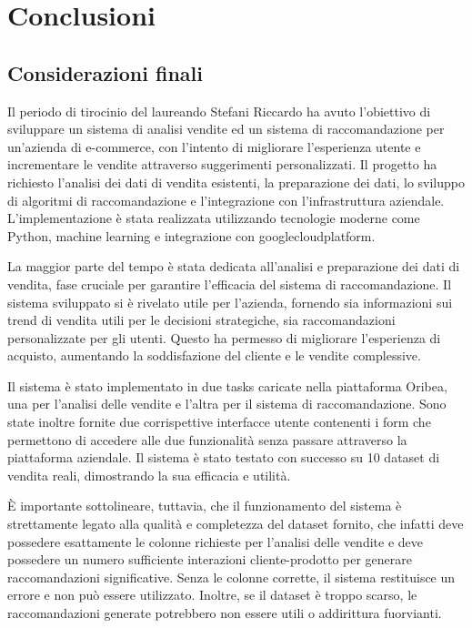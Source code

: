 \chapter{Conclusioni}
\label{cap:conclusioni}



\section{Considerazioni finali}

Il periodo di tirocinio del laureando Stefani Riccardo ha avuto l'obiettivo di sviluppare un sistema di analisi vendite ed un sistema di raccomandazione per un'azienda di e-commerce, con l'intento di migliorare l'esperienza utente e incrementare le vendite attraverso suggerimenti personalizzati. Il progetto ha richiesto l'analisi dei dati di vendita esistenti, la preparazione dei dati, lo sviluppo di algoritmi di raccomandazione e l'integrazione con l'infrastruttura aziendale. L'implementazione è stata realizzata utilizzando tecnologie moderne come Python, machine learning e integrazione con \gls{googlecloudplatform}.

La maggior parte del tempo è stata dedicata all'analisi e preparazione dei dati di vendita, fase cruciale per garantire l'efficacia del sistema di raccomandazione. Il sistema sviluppato si è rivelato utile per l'azienda, fornendo sia informazioni sui trend di vendita utili per le decisioni strategiche, sia raccomandazioni personalizzate per gli utenti. Questo ha permesso di migliorare l'esperienza di acquisto, aumentando la soddisfazione del cliente e le vendite complessive.

Il sistema è stato implementato in due tasks caricate nella piattaforma Oribea, una per l'analisi delle vendite e l'altra per il sistema di raccomandazione. Sono state inoltre fornite due corrispettive interfacce utente contenenti i form che permettono di accedere alle due funzionalità senza passare attraverso la piattaforma aziendale. Il sistema è stato testato con successo su 10 dataset di vendita reali, dimostrando la sua efficacia e utilità.

È importante sottolineare, tuttavia, che il funzionamento del sistema è strettamente legato alla qualità e completezza del dataset fornito, che infatti deve possedere esattamente le colonne richieste per l'analisi delle vendite e deve possedere un numero sufficiente interazioni cliente-prodotto per generare raccomandazioni significative. Senza le colonne corrette, il sistema restituisce un errore e non può essere utilizzato. Inoltre, se il dataset è troppo scarso, le raccomandazioni generate potrebbero non essere utili o addirittura fuorvianti.


